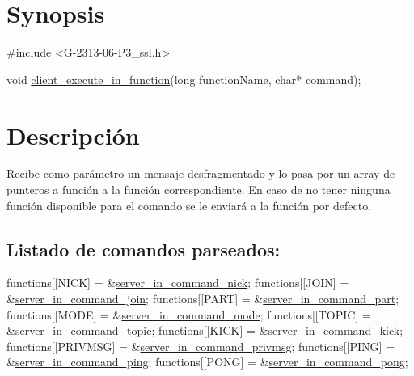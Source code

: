 \hypertarget{client_execute_in_function_synopsis_4}{}\section{Synopsis}\label{client_execute_in_function_synopsis_4}

\begin{DoxyCode}
\textcolor{preprocessor}{#include <G-2313-06-P3\_ssl.h>}

\textcolor{keywordtype}{void} \hyperlink{G-2313-06-P2__client_8h_a6dd72e0b56b87f85d8cac2a30066198b}{client\_execute\_in\_function}(\textcolor{keywordtype}{long} functionName, \textcolor{keywordtype}{char}* command);
\end{DoxyCode}
 \hypertarget{client_execute_in_function_descripcion_4}{}\section{Descripción}\label{client_execute_in_function_descripcion_4}
Recibe como parámetro un mensaje desfragmentado y lo pasa por un array de punteros a función a la función correspondiente. En caso de no tener ninguna función disponible para el comando se le enviará a la función por defecto. ~\newline
\subsection*{Listado de comandos parseados\+:}


\begin{DoxyCode}
functions[[NICK]             = &\hyperlink{G-2313-06-P2__client__function__handlers_8h_a3271de16b2f7077059343bd6f52e4866}{server\_in\_command\_nick};
functions[[JOIN]             = &\hyperlink{G-2313-06-P2__client__function__handlers_8h_a64c324e32edf01774722861d3abc7be3}{server\_in\_command\_join};
functions[[PART]             = &\hyperlink{G-2313-06-P2__client__function__handlers_8h_a53568ffb9d2301140815861c2f7178ad}{server\_in\_command\_part};
functions[[MODE]             = &\hyperlink{G-2313-06-P2__client__function__handlers_8h_ae5f66619469f8ea0efa0a7a5d75938dc}{server\_in\_command\_mode};
functions[[TOPIC]            = &\hyperlink{G-2313-06-P2__client__function__handlers_8h_ad908abfd32d53b9483d5afa4ca18ff14}{server\_in\_command\_topic};
functions[[KICK]             = &\hyperlink{G-2313-06-P2__client__function__handlers_8h_aa3d18c616914957b9794f086466788bb}{server\_in\_command\_kick};
functions[[PRIVMSG]          = &\hyperlink{G-2313-06-P2__client__function__handlers_8h_a32594eebe5482f63993568825a9e126a}{server\_in\_command\_privmsg};
functions[[PING]             = &\hyperlink{G-2313-06-P2__client__function__handlers_8h_a09a9d4d13037bd783036a70d5a76ac46}{server\_in\_command\_ping};
functions[[PONG]             = &\hyperlink{G-2313-06-P2__client__function__handlers_8h_a06042a6459e89e0ae7586e66f8595fa3}{server\_in\_command\_pong};
\end{DoxyCode}
 ~\newline
